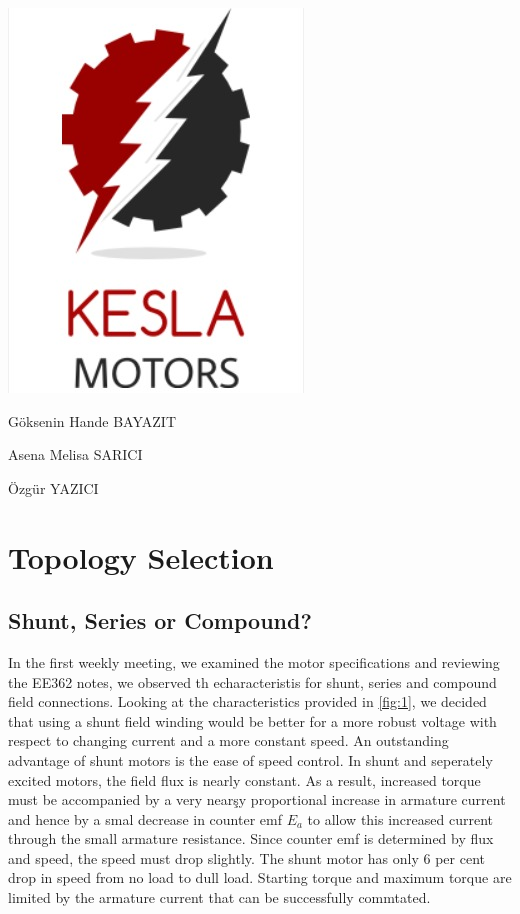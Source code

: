 \documentclass[10pt,a4paper]{article}
\begin{document}
\begin{titlepage}
\centering


\includegraphics[scale=0.8]{Logo.PNG} \par

\LARGE
\vspace{2cm}
{Göksenin Hande BAYAZIT\par Asena Melisa SARICI\par Özgür YAZICI}


\end{titlepage}

\newpage

\section*{Topology Selection}

\subsection*{Shunt, Series or Compound?}
In the first weekly meeting, we examined the motor specifications and reviewing the EE362 notes, we observed th echaracteristis for shunt, series and compound field connections. Looking at the characteristics provided in \ref{fig:1}, we decided that using a shunt field winding would be better for a more robust voltage with respect to changing current and a more constant speed.  An outstanding advantage of shunt motors is the ease of speed control.  In shunt and seperately excited motors, the field flux is nearly constant. As a result, increased torque must be accompanied by a very nearşy proportional increase in armature current and hence by a smal decrease in counter emf $E_{a}$ to allow this increased current through the small armature resistance.  Since counter emf is determined by flux and speed, the speed must drop slightly. The shunt motor has only 6 per cent drop in speed from no load to dull load. Starting torque and maximum torque are limited by the armature current that can be successfully commtated.
\end{document}
